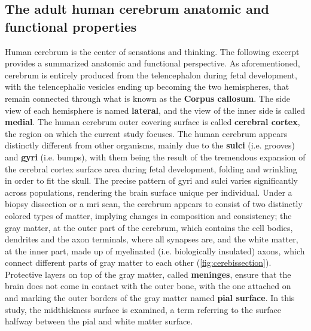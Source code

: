 \subsection{The adult human cerebrum anatomic and functional properties}
 Human cerebrum is the center of sensations and thinking. The following excerpt provides a summarized anatomic \cite{Bear2016chapter7app} and functional \cite{Ferng2022} perspective.  As aforementioned, cerebrum is entirely produced  from the telencephalon during fetal development, with the telencephalic vesicles ending up becoming the two hemispheres, that remain connected through what is known as the \textbf{Corpus callosum}.  The side view of each hemisphere is named \textbf{lateral}, and the view of the inner side is called \textbf{medial}. The human cerebrum outer covering surface is called \textbf{cerebral cortex}, the region on which the current study focuses. The human cerebrum appears distinctly different from other organisms, mainly due to the \textbf{sulci} (i.e. grooves) and \textbf{gyri} (i.e. bumps), with them being the result of the tremendous expansion of the cerebral cortex surface area during fetal development, folding and wrinkling in order to fit the skull. The precise pattern of gyri and sulci varies significantly across populations, rendering the brain surface unique per individual. Under a biopsy dissection or a \ac{mri} scan, the cerebrum appears to consist of two distinctly colored types of matter, implying changes in composition and consistency; the gray matter, at the outer part of the cerebrum, which  contains the cell bodies, dendrites and the axon terminals, where all synapses are, and the white matter, at the inner part, made up of myelinated (i.e. biologically insulated) axons, which connect different parts of gray matter to each other (\autoref{fig:cerebissection}). Protective layers on top of the gray matter, called \textbf{meninges}, ensure that the brain does not come in contact with the outer bone, with the one attached on and marking the outer borders of the gray matter named \textbf{pial surface}. In this study, the midthickness surface is examined, a term referring to the surface halfway between the pial and white matter surface. 

